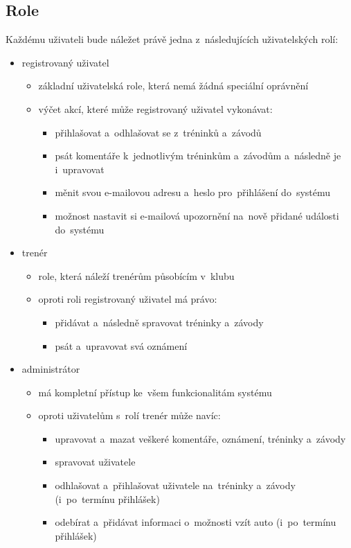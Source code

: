 \subsection{Role}
\label{section:role}
Každému uživateli bude náležet právě jedna z~následujících uživatelských rolí:
\begin{itemize}
	\item registrovaný uživatel
	\begin{itemize}
		\item základní uživatelská role, která nemá žádná speciální oprávnění
		\item výčet akcí, které může registrovaný uživatel vykonávat:
		\begin{itemize}
			\item přihlašovat a~odhlašovat se z~tréninků a~závodů
			\item psát komentáře k~jednotlivým tréninkům a~závodům a~následně je i~upravovat
			\item měnit svou e-mailovou adresu a~heslo pro~přihlášení do~systému
			\item možnost nastavit si e-mailová upozornění na~nově přidané události do~systému
		\end{itemize}
	\end{itemize}
	\item trenér
	\begin{itemize}
		\item role, která náleží trenérům působícím v~klubu
		\item oproti roli registrovaný uživatel má právo:
		\begin{itemize}
			\item přidávat a~následně spravovat tréninky a~závody
			\item psát a~upravovat svá oznámení
		\end{itemize}
	\end{itemize}
	\item administrátor
	\begin{itemize}
		\item má kompletní přístup ke~všem funkcionalitám systému
		\item oproti uživatelům s~rolí trenér může navíc:
		\begin{itemize}
			\item upravovat a~mazat veškeré komentáře, oznámení, tréninky a~závody
			\item spravovat uživatele
			\item odhlašovat a~přihlašovat uživatele na~tréninky a~závody (i~po~termínu přihlášek)
			\item odebírat a~přidávat informaci o~možnosti vzít auto (i~po~termínu přihlášek)
		\end{itemize}
	\end{itemize}
\end{itemize}
